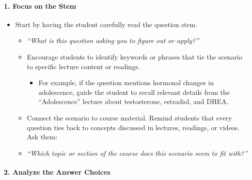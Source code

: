 \documentclass[
]{article}
\providecommand{\tightlist}{%
  \setlength{\itemsep}{0pt}\setlength{\parskip}{0pt}}
\begin{document}
\hypertarget{focus-on-the-stem}{%
\paragraph*{1. Focus on the Stem}\label{focus-on-the-stem}}

\begin{itemize}
\tightlist
\item
  Start by having the student carefully read the question stem.

  \begin{itemize}
  \tightlist
  \item
    \emph{``What is this question asking you to figure out or apply?''}
  \item
    Encourage students to identify keywords or phrases that tie the scenario to specific lecture content or readings.

    \begin{itemize}
    \tightlist
    \item
      For example, if the question mentions hormonal changes in adolescence, guide the student to recall relevant details from the ``Adolescence'' lecture about testosterone, estradiol, and DHEA.
    \end{itemize}
  \item
    Connect the scenario to course material. Remind students that every question ties back to concepts discussed in lectures, readings, or videos. Ask them:
  \item
    \emph{``Which topic or section of the course does this scenario seem to fit with?''}
  \end{itemize}
\end{itemize}

\hypertarget{analyze-the-answer-choices}{%
\paragraph*{2. Analyze the Answer Choices}\label{analyze-the-answer-choices}}
\end{document}
